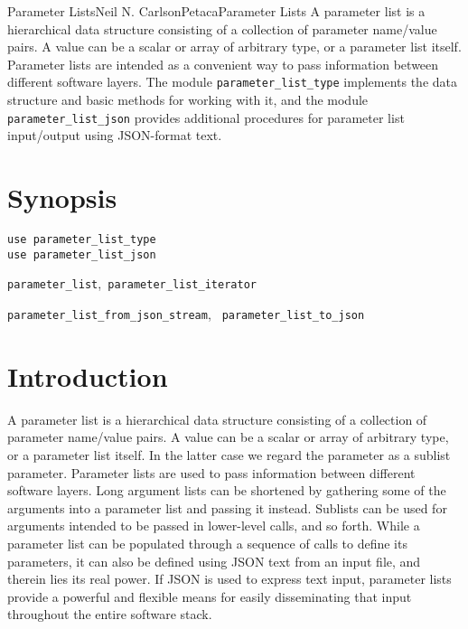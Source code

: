 \documentclass[11pt]{article}
\begin{document}

\begin{Name}{3}{Parameter Lists}{Neil N. Carlson}{Petaca}{Parameter Lists}
A parameter list is a hierarchical data structure consisting of a collection
of parameter name/value pairs.  A value can be a scalar or array of arbitrary
type, or a parameter list itself.  Parameter lists are intended as a convenient
way to pass information between different software layers.  The module
\texttt{parameter_list_type} implements the data structure and basic methods
for working with it, and the module \texttt{parameter_list_json}
provides additional procedures for parameter list input/output using
JSON-format text.
\end{Name}

\section{Synopsis}
\begin{description}[style=nextline]
\item[Usage]
  \texttt{use parameter_list_type}\\
  \texttt{use parameter_list_json}
\item[Derived Types]
  \texttt{parameter_list},\texttt{ parameter_list_iterator}
\item[Procedures]
  \texttt{parameter_list_from_json_stream},
  \texttt{ parameter_list_to_json}
\end{description}

\section{Introduction}
A parameter list is a hierarchical data structure consisting of a collection
of parameter name/value pairs.  A value can be a scalar or array of arbitrary
type, or a parameter list itself.  In the latter case we regard the parameter
as a sublist parameter.  Parameter lists are used to pass information between
different software layers.  Long argument lists can be shortened by gathering
some of the arguments into a parameter list and passing it instead.  Sublists
can be used for arguments intended to be passed in lower-level calls, and so
forth.  While a parameter list can be populated through a sequence of calls
to define its parameters, it can also be defined using JSON text from an input
file, and therein lies its real power.  If JSON is used to express text input,
parameter lists provide a powerful and flexible means for easily disseminating
that input throughout the entire software stack.
\end{document}
